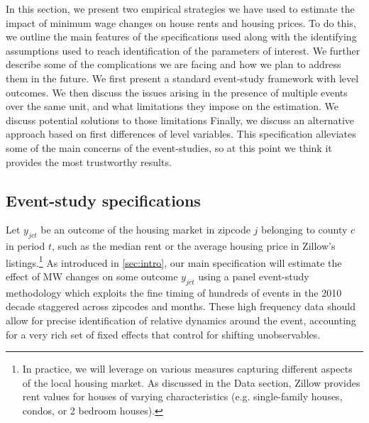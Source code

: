 
In this section, we present two empirical strategies we have used to estimate the impact of minimum wage changes on house rents and housing prices. To do this, we outline the main features of the specifications used along with the identifying assumptions used to reach identification of the parameters of interest. We further describe some of the complications we are facing and how we plan to address them in the future. We first present a standard event-study framework with level outcomes. We then discuss the issues arising in the presence of multiple events over the same unit, and what limitations they impose on the estimation. We discuss potential solutions to those limitations Finally, we discuss an alternative approach based on first differences of level variables. This specification  alleviates some of the main concerns of the event-studies, so at this point we think it provides the most trustworthy results.

\subsection{Event-study specifications} \label{subsec:empirical_strategy/event-study}

    Let $y_{jct}$ be an outcome of the housing market in zipcode $j$ belonging to county $c$ in period $t$, such as the median rent or the average housing price in Zillow's listings.\footnote{In practice, we will leverage on various measures capturing different aspects of the local housing market. As discussed in the Data section, Zillow provides rent values for houses of varying characteristics (e.g. single-family houses, condos, or 2 bedroom houses).} As introduced in \autoref{sec:intro}, our main specification will estimate the effect of MW changes on some outcome $y_{jct}$ using a panel event-study methodology which exploits the fine timing of hundreds of events in the 2010 decade staggered across zipcodes and months. These high frequency data should allow for precise identification of relative dynamics around the event, accounting for a very rich set of fixed effects that control for shifting unobservables.
    
